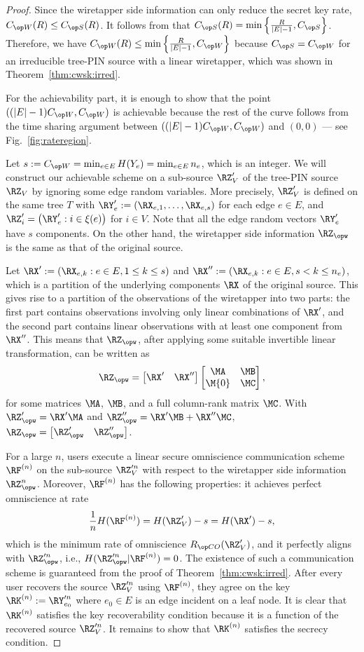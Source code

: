 \begin{proof}
Since the wiretapper side information can only reduce the secret key rate, $\wskc(R) \leq \skc(R)$. It follows from \cite[Theorem~4.2]{chan19} that $\skc(R) =  \min \left\{\frac{R}{|E|-1}, \skc\right\}$. Therefore, we have $\wskc(R) \leq \min \left\{\frac{R}{|E|-1}, \wskc\right\}$ because $\skc =\wskc$ for an irreducible tree-PIN source with a linear wiretapper, which was shown in Theorem~\ref{thm:cwsk:irred}.

For the achievability part, it is enough to show that the point $((|E|-1)\wskc,\wskc)$ is achievable because the rest of the curve follows from the time sharing argument between $((|E|-1)\wskc,\wskc)$ and $(0,0)$ ---  see Fig.~\ref{fig:rateregion}.

Let $s:=\wskc=\min_{e \in E}H(Y_e)=\min_{e \in E}n_e$, which is an integer. We will construct our achievable scheme on a sub-source  $\RZ'_V$ of the tree-PIN source $\RZ_V$ by ignoring some edge random variables. More precisely, $\RZ'_V$ is defined on the same tree $T$ with $\RY'_e := \left( \RX_{e,1}, \ldots, \RX_{e,s} \right)$ for each edge $e \in E$, and $\RZ'_i = \left( \RY'_e : i \in \xi (e) \right)$ for $i \in V$. Note that all the edge random vectors $\RY'_e$ have $s$ components. On the other hand, the  wiretapper side information $\RZ_{\opw}$ is the same as that of the original source. 

Let $\RX' :=(\RX_{e,k}: e\in E, 1 \leq k \leq s)$ and  $\RX'' :=(\RX_{e,k}: e\in E, s < k \leq n_e)$, which is a partition of the underlying components $\RX$ of the original source. This gives rise to a partition of the observations of the wiretapper into two parts: the first part contains observations involving only linear combinations of $\RX'$, and the second part contains linear observations with at least one component from $\RX''$. This means that $\RZ_{\opw}$, after applying some suitable invertible linear transformation, can be written as 
$$\RZ_{\opw} = \bM \RX' & \RX''\eM \bM \MA & \MB \\ \M{0} & \MC \eM ,$$ for some matrices $\MA$, $\MB$, and a full column-rank matrix $\MC$. With $\RZ'_{\opw}=\RX'\MA$ and $\RZ''_{\opw}=\RX'\MB + \RX''\MC$, $\RZ_{\opw} = \bM \RZ'_{\opw} & \RZ''_{\opw} \eM$.

For a large $n$,  users execute a linear secure omniscience communication scheme $\RF^{(n)}$ on the sub-source $\RZ'^n_V$ with respect to the wiretapper side information $\RZ^n_{\opw}$. Moreover, $\RF^{(n)}$ has the following properties: it achieves perfect omniscience at rate 
$$\frac{1}{n}H(\RF^{(n)})=H(\RZ'_V)-s=H(\RX')-s,$$ which is the minimum rate of omniscience $\rco(\RZ'_V)$, and it perfectly aligns with $\RZ'^n_{\opw}$, i.e., $H(\RZ'^n_{\opw}|\RF^{(n)})=0$. The existence of such a communication scheme is guaranteed from the proof of Theorem~\ref{thm:cwsk:irred}. After every user recovers the source $\RZ'^n_V$ using $\RF^{(n)}$, they agree on the key $\RK^{(n)}:=\RY'^n_{e_0}$ where $e_0 \in E$ is an edge incident on a leaf node. It is clear that $\RK^{(n)}$ satisfies the key recoverability condition because it is a function of the recovered source $\RZ'^n_V$. It remains to show that $\RK^{(n)}$ satisfies the secrecy condition.


\end{proof}
